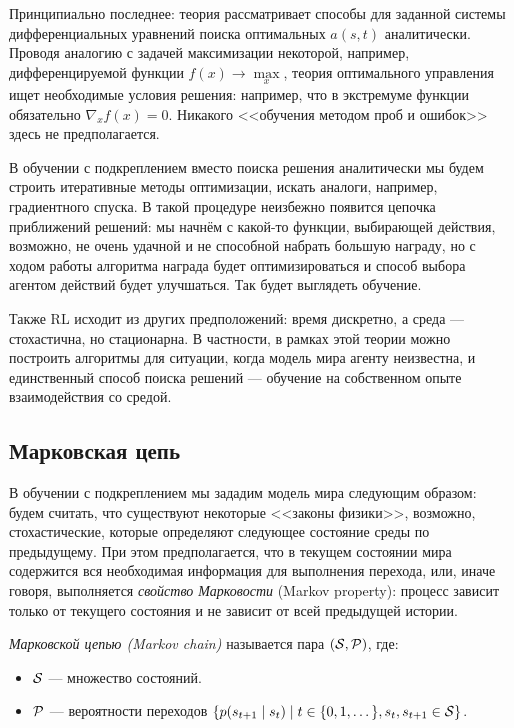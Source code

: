 Принципиально последнее: теория рассматривает способы для заданной системы дифференциальных уравнений поиска оптимальных $a(s, t)$ аналитически. Проводя аналогию с задачей максимизации некоторой, например, дифференцируемой функции $f(x) \to \max\limits_x$, теория оптимального управления ищет необходимые условия решения: например, что в экстремуме функции обязательно $\nabla_x f(x) = 0$. Никакого <<обучения методом проб и ошибок>> здесь не предполагается.

В обучении с подкреплением вместо поиска решения аналитически мы будем строить итеративные методы оптимизации, искать аналоги, например, градиентного спуска. В такой процедуре неизбежно появится цепочка приближений решений: мы начнём с какой-то функции, выбирающей действия, возможно, не очень удачной и не способной набрать большую награду, но с ходом работы алгоритма награда будет оптимизироваться и способ выбора агентом действий будет улучшаться. Так будет выглядеть обучение.

Также RL исходит из других предположений: время дискретно, а среда --- стохастична, но стационарна. В частности, в рамках этой теории можно построить алгоритмы для ситуации, когда модель мира агенту неизвестна, и единственный способ поиска решений --- обучение на собственном опыте взаимодействия со средой.  

\subsection{Марковская цепь}

В обучении с подкреплением мы зададим модель мира следующим образом: будем считать, что существуют некоторые <<законы физики>>, возможно, стохастические, которые определяют следующее состояние среды по предыдущему. При этом предполагается, что в текущем состоянии мира содержится вся необходимая информация для выполнения перехода, или, иначе говоря, выполняется \emph{свойство Марковости} (Markov property): процесс зависит только от текущего состояния и не зависит от всей предыдущей истории.

\begin{definition} 
\emph{Марковской цепью (Markov chain)} называется пара $(\mathcal{S}, \mathcal{P})$, где: 
\begin{itemize}
    \item $\mathcal{S}$ --- множество состояний.
    \item $\mathcal{P}$ --- вероятности переходов $\{p(s_{t+1} \HM\mid s_t) \HM\mid t \HM\in \{0, 1, \dots \}, s_t, s_{t+1} \HM\in \St\}$.
\end{itemize}
\end{definition}

